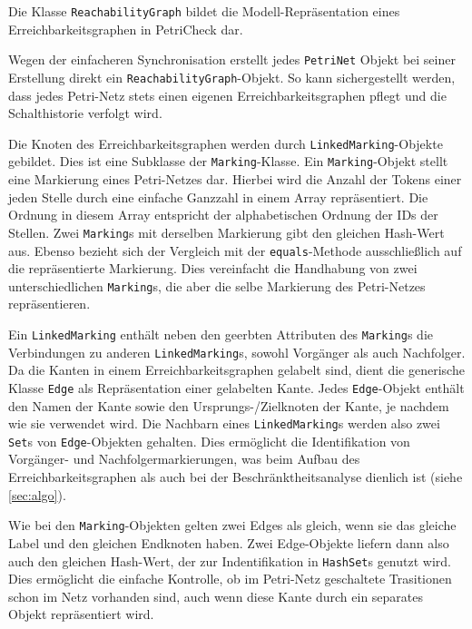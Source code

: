 Die Klasse \texttt{ReachabilityGraph} bildet die Modell-Repräsentation eines
Erreichbarkeitsgraphen in PetriCheck dar.

Wegen der einfacheren Synchronisation erstellt jedes \texttt{PetriNet} Objekt
bei seiner Erstellung direkt ein \texttt{ReachabilityGraph}-Objekt. So kann
sichergestellt werden, dass jedes Petri-Netz stets einen eigenen
Erreichbarkeitsgraphen pflegt und die Schalthistorie verfolgt wird.

Die Knoten des Erreichbarkeitsgraphen werden durch
\texttt{LinkedMarking}-Objekte gebildet. Dies ist eine Subklasse der
\texttt{Marking}-Klasse. Ein \texttt{Marking}-Objekt stellt eine Markierung
eines Petri-Netzes dar. Hierbei wird die Anzahl der Tokens einer jeden Stelle
durch eine einfache Ganzzahl in einem Array repräsentiert. Die Ordnung in diesem
Array entspricht der alphabetischen Ordnung der IDs der Stellen. Zwei
\texttt{Marking}s mit derselben Markierung gibt den gleichen Hash-Wert aus.
Ebenso bezieht sich der Vergleich mit der \texttt{equals}-Methode ausschließlich
auf die repräsentierte Markierung. Dies vereinfacht die Handhabung von zwei
unterschiedlichen \texttt{Marking}s, die aber die selbe Markierung des
Petri-Netzes repräsentieren.

Ein \texttt{LinkedMarking} enthält neben den geerbten Attributen des
\texttt{Marking}s die Verbindungen zu anderen \texttt{LinkedMarking}s, sowohl
Vorgänger als auch Nachfolger. Da die Kanten in einem Erreichbarkeitsgraphen
gelabelt sind, dient die generische Klasse \texttt{Edge} als Repräsentation
einer gelabelten Kante. Jedes \texttt{Edge}-Objekt enthält den Namen der Kante
sowie den Ursprungs-/Zielknoten der Kante, je nachdem wie sie verwendet wird.
Die Nachbarn eines \texttt{LinkedMarking}s werden also zwei \texttt{Set}s von
\texttt{Edge}-Objekten gehalten. Dies ermöglicht die Identifikation von
Vorgänger- und Nachfolgermarkierungen, was beim Aufbau des
Erreichbarkeitsgraphen als auch bei der Beschränktheitsanalyse dienlich ist
(siehe \cref{sec:algo}).

Wie bei den \texttt{Marking}-Objekten gelten zwei Edges als gleich, wenn sie das
gleiche Label und den gleichen Endknoten haben. Zwei Edge-Objekte liefern dann
also auch den gleichen Hash-Wert, der zur Indentifikation in \texttt{HashSet}s
genutzt wird. Dies ermöglicht die einfache Kontrolle, ob im Petri-Netz
geschaltete Trasitionen schon im Netz vorhanden sind, auch wenn diese Kante
durch ein separates Objekt repräsentiert wird.

